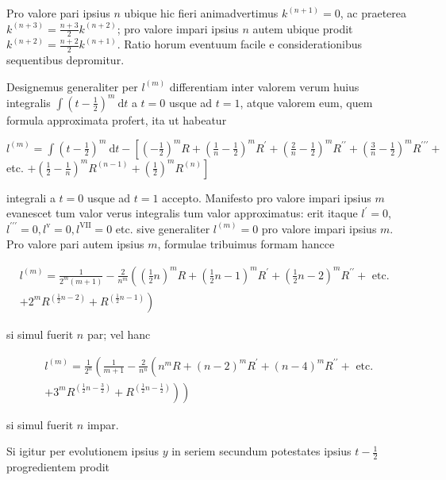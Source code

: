 \documentclass[10pt]{article}
\begin{document}
Pro valore pari ipsius \(n\) ubique hic fieri animadvertimus \(k^{(n+1)}=0\), ac praeterea \(k^{(n+3)}=\frac{n+3}{2} k^{(n+2)}\); pro valore impari ipsius \(n\) autem ubique prodit \(k^{(n+2)}=\frac{n+2}{2} k^{(n+1)}\). Ratio horum eventuum facile e considerationibus sequentibus depromitur.

Designemus generaliter per \(l^{(m)}\) differentiam inter valorem verum huius integralis \(\int\left(t-\frac{1}{2}\right)^{m} \mathrm{~d} t\) a \(t=0\) usque ad \(t=1\), atque valorem eum, quem formula approximata profert, ita ut habeatur

\(l^{(m)}=\int\left(t-\frac{1}{2}\right)^{m} \mathrm{~d} t-\left[\left(-\frac{1}{2}\right)^{m} R+\left(\frac{1}{n}-\frac{1}{2}\right)^{m} R^{\prime}+\left(\frac{2}{n}-\frac{1}{2}\right)^{m} R^{\prime \prime}+\left(\frac{3}{n}-\frac{1}{2}\right)^{m} R^{\prime \prime \prime}+\right.\) etc. \(\left.+\left(\frac{1}{2}-\frac{1}{n}\right)^{m} R^{(n-1)}+\left(\frac{1}{2}\right)^{m} R^{(n)}\right]\)

integrali a \(t=0\) usque ad \(t=1\) accepto. Manifesto pro valore impari ipsius \(m\) evanescet tum valor verus integralis tum valor approximatus: erit itaque \(l^{\prime}=0\), \(l^{\prime \prime \prime}=0, l^{\mathrm{v}}=0, l^{\mathrm{VII}}=0\) etc. sive generaliter \(l^{(m)}=0\) pro valore impari ipsius \(m\). Pro valore pari autem ipsius \(m\), formulae tribuimus formam hancce

\[
\begin{gathered}
l^{(m)}=\frac{1}{2^{m}(m+1)}-\frac{2}{n^{m}}\left(\left(\frac{1}{2} n\right)^{m} R+\left(\frac{1}{2} n-1\right)^{m} R^{\prime}+\left(\frac{1}{2} n-2\right)^{m} R^{\prime \prime}+\right.\text { etc. } \\
\left.+2^{m} R^{\left(\frac{1}{2} n-2\right)}+R^{\left(\frac{1}{2} n-1\right)}\right)
\end{gathered}
\]

si simul fuerit \(n\) par; vel hanc

\[
\begin{aligned}
& l^{(m)}=\frac{1}{2^{n}}\left(\frac{1}{m+1}-\frac{2}{n^{n}}\left(n^{m} R+(n-2)^{m} R^{\prime}+(n-4)^{m} R^{\prime \prime}+\right.\text { etc. }\right. \\
& \left.\left.+3^{m} R^{\left(\frac{1}{2} n-\frac{3}{2}\right)}+R^{\left(\frac{1}{2} n-\frac{1}{2}\right)}\right)\right)
\end{aligned}
\]

si simul fuerit \(n\) impar.

Si igitur per evolutionem ipsius \(y\) in seriem secundum potestates ipsius \(t-\frac{1}{2}\) progredientem prodit
\end{document}
